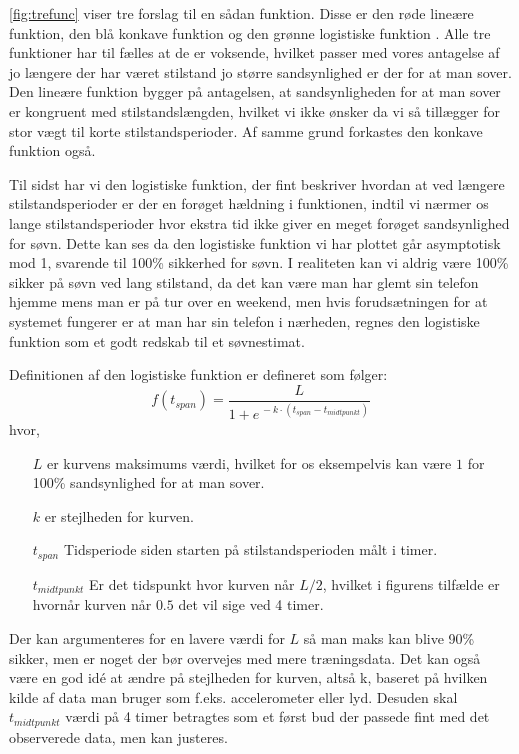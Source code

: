 \cref{fig:trefunc} viser tre forslag til en sådan funktion.
Disse er den røde lineære funktion, den blå konkave funktion og den grønne logistiske funktion \citep{wiki:LogisticFunction}.
Alle tre funktioner har til fælles at de er voksende, hvilket passer med vores antagelse af jo længere der har været stilstand jo større sandsynlighed er der for at man sover.
Den lineære funktion bygger på antagelsen, at sandsynligheden for at man sover er kongruent med stilstandslængden, hvilket vi ikke ønsker da vi så tillægger for stor vægt til korte stilstandsperioder.
Af samme grund forkastes den konkave funktion også.

Til sidst har vi den logistiske funktion, der fint beskriver hvordan at ved længere stilstandsperioder er der en forøget hældning i funktionen, indtil vi nærmer os lange stilstandsperioder hvor ekstra tid ikke giver en meget forøget sandsynlighed for søvn. 
Dette kan ses da den logistiske funktion vi har plottet går asymptotisk mod 1, svarende til 100\% sikkerhed for søvn.
I realiteten kan vi aldrig være 100\% sikker på søvn ved lang stilstand, da det kan være man har glemt sin telefon hjemme mens man er på tur over en weekend, men hvis forudsætningen for at systemet fungerer er at man har sin telefon i nærheden, regnes den logistiske funktion som et godt redskab til et søvnestimat.

Definitionen af den logistiske funktion er defineret som følger:
\begin{equation}
	f(t_{span}) = \frac{L}{1+e^{\,-k\cdot(t_{span} - t_{midtpunkt})}}
\end{equation} 
hvor,
\begin{itemize}
	\item[$L$] er kurvens maksimums værdi, hvilket for os eksempelvis kan være $1$ for 100\% sandsynlighed for at man sover.
	\item[$k$] er stejlheden for kurven.
	\item[$t_{span}$] Tidsperiode siden starten på stilstandsperioden målt i timer.
	\item[$t_{midtpunkt}$] Er det tidspunkt hvor kurven når $L/2$, hvilket i figurens tilfælde er hvornår kurven når $0.5$ det vil sige ved 4 timer.
\end{itemize}

Der kan argumenteres for en lavere værdi for $L$ så man maks kan blive 90\% sikker, men er noget der bør overvejes med mere træningsdata. 
Det kan også være en god idé at ændre på stejlheden for kurven, altså k, baseret på hvilken kilde af data man bruger som f.eks. accelerometer eller lyd.
Desuden skal $t_{midtpunkt}$ værdi på 4 timer betragtes som et først bud der passede fint med det observerede data, men kan justeres.

